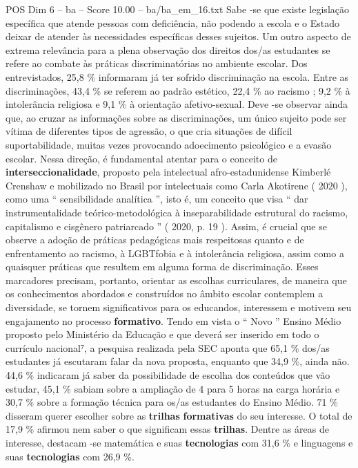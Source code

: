 \begin{textsample}{POS Dim 6 – ba – Score 10.00 – ba/ba\_em\_16.txt}
Sabe -se que existe legislação específica que atende pessoas com deficiência, não podendo a escola e o Estado deixar de atender às necessidades específicas desses sujeitos.
Um outro aspecto de extrema relevância para a plena observação dos direitos dos/as estudantes se refere ao combate às práticas discriminatórias no ambiente escolar.
Dos entrevistados, 25,8 \% informaram já ter sofrido discriminação na escola.
Entre as discriminações, 43,4 \% se referem ao padrão estético, 22,4 \% ao racismo ; 9,2 \% à intolerância religiosa e 9,1 \% à orientação afetivo-sexual.
Deve -se observar ainda que, ao cruzar as informações sobre as discriminações, um único sujeito pode ser vítima de diferentes tipos de agressão, o que cria situações de difícil suportabilidade, muitas vezes provocando adoecimento psicológico e a evasão escolar.
Nessa direção, é fundamental atentar para o conceito de \textbf{interseccionalidade}, proposto pela intelectual afro-estadunidense Kimberlé Crenshaw e mobilizado no Brasil por intelectuais como Carla Akotirene ( 2020 ), como uma “ sensibilidade analítica ”, isto é, um conceito que visa “ dar instrumentalidade teórico-metodológica à inseparabilidade estrutural do racismo, capitalismo e cisgênero patriarcado ” ( 2020, p. 19 ).
Assim, é crucial que se observe a adoção de práticas pedagógicas mais respeitosas quanto e de enfrentamento ao racismo, à LGBTfobia e à intolerância religiosa, assim como a quaisquer práticas que resultem em alguma forma de discriminação.
Esses marcadores precisam, portanto, orientar as escolhas curriculares, de maneira que os conhecimentos abordados e construídos no âmbito escolar contemplem a diversidade, se tornem significativos para os educandos, interessem e motivem seu engajamento no processo \textbf{formativo}.
Tendo em vista o “ Novo ” Ensino Médio proposto pelo Ministério da Educação e que deverá ser inserido em todo o currículo nacional⁷, a pesquisa realizada pela SEC aponta que 65,1 \% dos/as estudantes já escutaram falar da nova proposta, enquanto que 34,9 \%, ainda não. 44,6 \% indicaram já saber da possibilidade de escolha dos conteúdos que vão estudar, 45,1 \% sabiam sobre a ampliação de 4 para 5 horas na carga horária e 30,7 \% sobre a formação técnica para os/as estudantes do Ensino Médio. 71 \% disseram querer escolher sobre as \textbf{trilhas} \textbf{formativas} do seu interesse.
O total de 17,9 \% afirmou nem saber o que significam essas \textbf{trilhas}.
Dentre as áreas de interesse, destacam -se matemática e suas \textbf{tecnologias} com 31,6 \% e linguagens e suas \textbf{tecnologias} com 26,9 \%.

\end{textsample}
